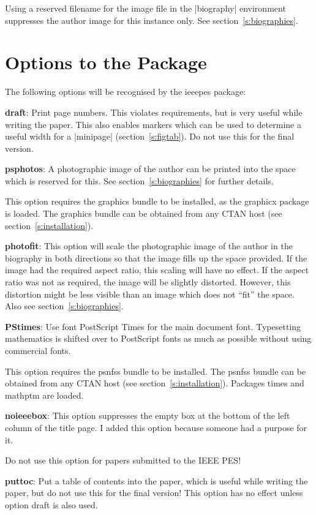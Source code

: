 \documentclass[twoside,twocolumn,a4paper]{article}
\begin{document}
Using a reserved filename for the image file in the |biography| environment
suppresses the author image for this instance only. See
section~\ref{s:biographies}.



\section{Options to the Package}
\label{s:options}

The following options will be recognised by the ieeepes package:

\begin{description}
\item{\textbf{draft}}:
	Print page numbers. This violates requirements, but is very useful
	while writing the paper. This also enables markers which can be used to
	determine a useful width for a |minipage| (section~\ref{s:figtab}). Do
	not use this for the final version.

\item{\textbf{psphotos}}:
	A photographic image of the author can be printed into the
	space which is reserved for this. See
	section~\ref{s:biographies} for further details.

	This option requires the graphics bundle to be installed, as the
	graphicx package is loaded. The graphics bundle can be obtained from
	any CTAN host (see section~\ref{s:installation}).

\item{\textbf{photofit}}:
	This option will scale the photographic image of the author in
	the biography in both directions so that the image fills up the
	space provided. If the image had the required aspect ratio,
	this scaling will have no effect. If the aspect ratio was not
	as required, the image will be slightly distorted. However,
	this distortion might be less visible than an image which does
	not ``fit'' the space. Also see section~\ref{s:biographies}.
	
\item{\textbf{PStimes}}:
	Use font PostScript Times for the main document font.
	Typesetting mathematics is shifted over to PostScript fonts as
	much as possible without using commercial fonts.

	This option requires the psnfss bundle to be installed. The psnfss
	bundle can be obtained from any CTAN host (see
	section~\ref{s:installation}). Packages times and mathptm are loaded.

\item{\textbf{noieeebox}}:
	This option suppresses the empty box at the bottom of the left
	column of the title page. I added this option because someone
	had a purpose for it.

	Do not use this option for papers submitted to the IEEE PES!

\item{\textbf{puttoc}}:
	Put a table of contents into the paper, which is useful while writing
	the paper, but do not use this for the final version! This option has
	no effect unless option draft is also used.

\end{description}
\end{document}
